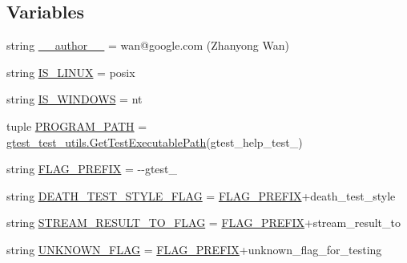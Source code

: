 \subsection*{Variables}
\begin{DoxyCompactItemize}
\item 
string \hyperlink{namespacegtest__help__test_aaad2d635f301ee74567f210b26c828b1}{\+\_\+\+\_\+author\+\_\+\+\_\+} = \textquotesingle{}wan@google.\+com (Zhanyong Wan)\textquotesingle{}
\item 
string \hyperlink{namespacegtest__help__test_ae61a149d50be253176a139fbe6712582}{I\+S\+\_\+\+L\+I\+N\+U\+X} = \textquotesingle{}posix\textquotesingle{}
\item 
string \hyperlink{namespacegtest__help__test_a0f8d4b00fc83b1e72bbb5eca5f3bc4d7}{I\+S\+\_\+\+W\+I\+N\+D\+O\+W\+S} = \textquotesingle{}nt\textquotesingle{}
\item 
tuple \hyperlink{namespacegtest__help__test_a8477d662626da4ff2f370c330bfa7e3f}{P\+R\+O\+G\+R\+A\+M\+\_\+\+P\+A\+T\+H} = \hyperlink{namespacegtest__test__utils_a1bdf3cac86afa675ed37629b183048e9}{gtest\+\_\+test\+\_\+utils.\+Get\+Test\+Executable\+Path}(\textquotesingle{}gtest\+\_\+help\+\_\+test\+\_\+\textquotesingle{})
\item 
string \hyperlink{namespacegtest__help__test_a9e357a76dd993057c826ec411c9a4b3c}{F\+L\+A\+G\+\_\+\+P\+R\+E\+F\+I\+X} = \textquotesingle{}-\/-\/gtest\+\_\+\textquotesingle{}
\item 
string \hyperlink{namespacegtest__help__test_a322bbb8bf27d7701c76fb5704a1fda1f}{D\+E\+A\+T\+H\+\_\+\+T\+E\+S\+T\+\_\+\+S\+T\+Y\+L\+E\+\_\+\+F\+L\+A\+G} = \hyperlink{namespacegtest__help__test_a9e357a76dd993057c826ec411c9a4b3c}{F\+L\+A\+G\+\_\+\+P\+R\+E\+F\+I\+X}+\textquotesingle{}death\+\_\+test\+\_\+style\textquotesingle{}
\item 
string \hyperlink{namespacegtest__help__test_a06d67cce3cb57c484c169d1dbe4afd6c}{S\+T\+R\+E\+A\+M\+\_\+\+R\+E\+S\+U\+L\+T\+\_\+\+T\+O\+\_\+\+F\+L\+A\+G} = \hyperlink{namespacegtest__help__test_a9e357a76dd993057c826ec411c9a4b3c}{F\+L\+A\+G\+\_\+\+P\+R\+E\+F\+I\+X}+\textquotesingle{}stream\+\_\+result\+\_\+to\textquotesingle{}
\item 
string \hyperlink{namespacegtest__help__test_a400934cf13530098af31e2a65f1a8d84}{U\+N\+K\+N\+O\+W\+N\+\_\+\+F\+L\+A\+G} = \hyperlink{namespacegtest__help__test_a9e357a76dd993057c826ec411c9a4b3c}{F\+L\+A\+G\+\_\+\+P\+R\+E\+F\+I\+X}+\textquotesingle{}unknown\+\_\+flag\+\_\+for\+\_\+testing\textquotesingle{}
\item 

\end{DoxyCompactItemize}
